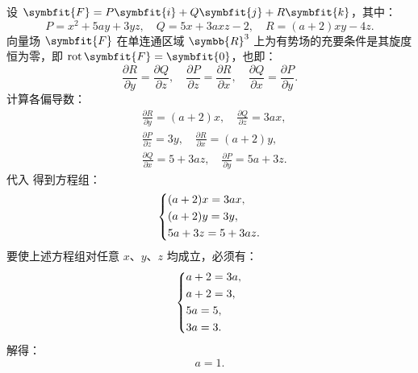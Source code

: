 \begin{solution}
    设 $\symbfit{F} = P \symbfit{i} + Q \symbfit{j} + R \symbfit{k}$，其中：
    \begin{equation}
        P = x^2 + 5ay + 3yz, \quad Q = 5x + 3axz - 2, \quad R = (a+2)xy - 4z.
    \end{equation}
    向量场 $\symbfit{F}$ 在单连通区域 $\symbb{R}^3$ 上为有势场的充要条件是其旋度恒为零，即 $\operatorname{rot} \symbfit{F} = \symbfit{0}$，也即：
    \begin{equation}
        \label{eq:curl-zero}
        \frac{\partial R}{\partial y} = \frac{\partial Q}{\partial z}, \quad
        \frac{\partial P}{\partial z} = \frac{\partial R}{\partial x}, \quad
        \frac{\partial Q}{\partial x} = \frac{\partial P}{\partial y}.
    \end{equation}
    计算各偏导数：
    \begin{equation}
        \begin{aligned}
             & \frac{\partial R}{\partial y} = (a+2)x, \quad \frac{\partial Q}{\partial z} = 3ax,      \\
             & \frac{\partial P}{\partial z} = 3y, \quad \frac{\partial R}{\partial x} = (a+2)y,       \\
             & \frac{\partial Q}{\partial x} = 5 + 3az, \quad \frac{\partial P}{\partial y} = 5a + 3z.
        \end{aligned}
    \end{equation}
    代入  得到方程组：
    \begin{equation}
        \begin{dcases}
            (a+2)x = 3ax, \\
            (a+2)y = 3y,  \\
            5a + 3z = 5 + 3az.
        \end{dcases}
    \end{equation}
    要使上述方程组对任意 $x$、$y$、$z$ 均成立，必须有：
    \begin{equation}
        \begin{dcases}
            a + 2 = 3a, \\
            a + 2 = 3,  \\
            5a = 5,     \\
            3a = 3.
        \end{dcases}
    \end{equation}
    解得：
    \begin{equation}
        a = 1.
    \end{equation}


\end{solution}
